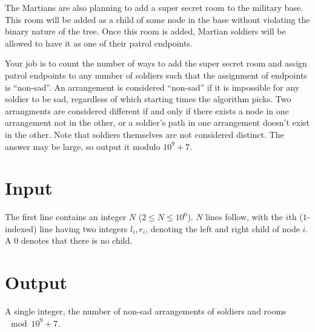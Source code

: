 The Martians are also planning to add a super secret room to the military base. This room will be added
as a child of some node in the base without violating the binary nature of the tree. Once this room is added,
Martian soldiers will be allowed to have it as one of their patrol endpoints.

Your job is to count the number of ways to add the super secret room and assign patrol endpoints to any
number of soldiers such that the assignment of endpoints is ``non-sad''. An arrangement is considered ``non-sad''
if it is impossible for any soldier to be sad, regardless of which starting times the algorithm picks. Two
arrangments are considered different if and only if there exists a node in one arrangement not in the other,
or a soldier's path in one arrangement doesn't exist in the other. Note that soldiers themselves are not
considered distinct. The answer may be large, so output it modulo $10^9 + 7$.

\section*{Input}
The first line contains an integer $N$ ($2 \leq N \leq 10^6$).
$N$ lines follow, with the $i$th ($1$-indexed) line having two integers $l_i, r_i$, denoting the left and
right child of node $i$. A $0$ denotes that there is no child.

\section*{Output}
A single integer, the number of non-sad arrangements of soldiers and rooms $\mod 10^9 + 7$.
